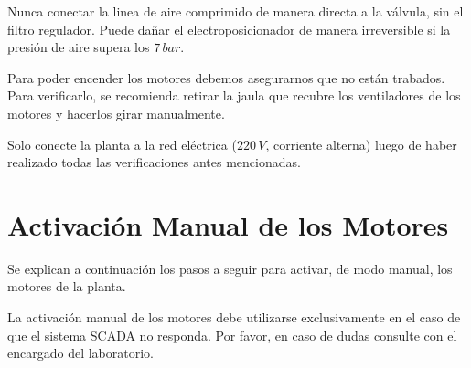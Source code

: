 \begin{lattention}
Nunca conectar la linea de aire comprimido de manera directa a la válvula,
sin el filtro regulador.
Puede dañar el electroposicionador de manera irreversible si la presión de aire
supera los $7\,bar$.
\end{lattention}

\begin{tcolorbox}[title=Motores]
Para poder encender los motores debemos asegurarnos que no están trabados.
Para verificarlo, se recomienda retirar la jaula que recubre los ventiladores
de los motores y hacerlos girar manualmente.
\end {tcolorbox}

\begin{lattention}
Solo conecte la planta a la red eléctrica ($220\,V$, corriente alterna) luego 
de haber realizado todas las verificaciones antes mencionadas. 
\end{lattention}

\section{Activación Manual de los Motores}
\label{anexo:motoresManual}
Se explican a continuación los pasos a seguir para activar, de modo manual, los
motores de la planta.
 \begin{lattention}
 La activación manual de los motores debe utilizarse exclusivamente en el caso
de que el sistema SCADA no responda.
Por favor, en caso de dudas consulte con el encargado del laboratorio.
\end{lattention}


